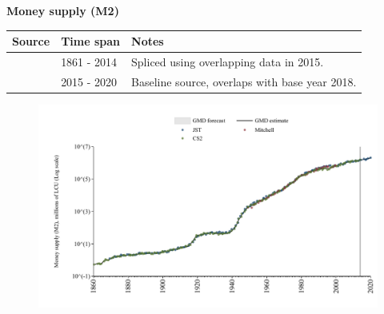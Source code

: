 \documentclass[12pt,a4paper,landscape]{article}
\begin{document}
\begin{adjustbox}{max totalsize={\paperwidth}{\paperheight},center}
\begin{minipage}[t][\textheight][t]{\textwidth}
\vspace*{0.5cm}
{}
\begin{center}
{\Large\bfseries Money supply (M2)}
\end{center}
\vspace{0.5cm}
\begin{table}[H]
\centering
\small
\begin{tabular}{|l|l|l|}
\hline
\textbf{Source} & \textbf{Time span} & \textbf{Notes} \\
\hline
\rowcolor{white}\cite{CS2_ITA}& 1861 - 2014 &Spliced using overlapping data in 2015. \\
\rowcolor{lightgray}\cite{JST}& 2015 - 2020 &Baseline source, overlaps with base year 2018. \\
\hline
\end{tabular}
\end{table}
\begin{figure}[H]
\centering
\includegraphics[width=\textwidth,height=0.6\textheight,keepaspectratio]{graphs/ITA_M2.pdf}
\end{figure}
\end{minipage}
\end{adjustbox}
\end{document}
